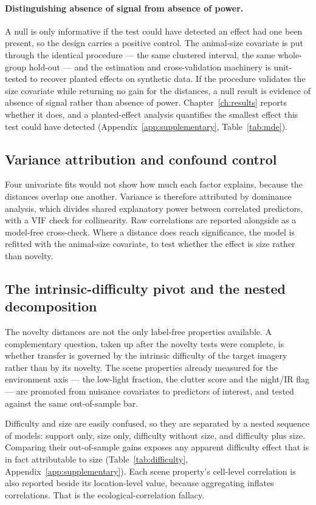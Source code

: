 \paragraph{Distinguishing absence of signal from absence of power.}
A null is only informative if the test could have detected an effect had one been present, so the design
carries a positive control. The animal-size covariate is put through the identical procedure --- the same
clustered interval, the same whole-group hold-out --- and the estimation and cross-validation machinery is
unit-tested to recover planted effects on synthetic data. If the procedure validates the size covariate while
returning no gain for the distances, a null result is evidence of absence of signal rather than absence of
power. Chapter~\ref{ch:results} reports whether it does, and a planted-effect analysis quantifies the
smallest effect this test could have detected (Appendix~\ref{app:supplementary}, Table~\ref{tab:mde}).

\subsection{Variance attribution and confound control}
\label{sec:meth-variance}
Four univariate fits would not show how much each factor explains, because the distances overlap one another.
Variance is therefore attributed by dominance analysis, which divides shared explanatory power between
correlated predictors, with a VIF check for collinearity. Raw correlations are reported alongside as a
model-free cross-check. Where a distance does reach significance, the model is refitted with the animal-size
covariate, to test whether the effect is size rather than novelty.

\subsection{The intrinsic-difficulty pivot and the nested decomposition}
The novelty distances are not the only label-free properties available. A complementary question, taken up
after the novelty tests were complete, is whether transfer is governed by the intrinsic difficulty of the
target imagery rather than by its novelty. The scene properties already measured for the environment axis ---
the low-light fraction, the clutter score and the night/IR flag --- are promoted from nuisance covariates to
predictors of interest, and tested against the same out-of-sample bar.

Difficulty and size are easily confused, so they are separated by a nested sequence of models: support only,
size only, difficulty without size, and difficulty plus size. Comparing their out-of-sample gains exposes any
apparent difficulty effect that is in fact attributable to size (Table~\ref{tab:difficulty},
Appendix~\ref{app:supplementary}). Each scene property's cell-level
correlation is also reported beside its location-level value, because aggregating inflates correlations. That
is the ecological-correlation fallacy.

